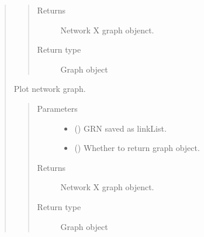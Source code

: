 \documentclass[letterpaper,10pt,english]{sphinxmanual}
\begin{document}
\begin{quote}
\begin{fulllineitems}
\begin{quote}
\begin{description}
\item[{Returns}] \leavevmode
Network X graph objenct.

\item[{Return type}] \leavevmode
Graph object

\end{description}\end{quote}

\end{fulllineitems}


\begin{fulllineitems}
\label{\detokenize{modules/celloracle.network_analysis:celloracle.network_analysis.draw_network}}
Plot network graph.
\begin{quote}\begin{description}
\item[{Parameters}] \leavevmode\begin{itemize}
\item {} 
 () \textendash{} GRN saved as linkList.

\item {} 
 () \textendash{} Whether to return graph object.

\end{itemize}

\item[{Returns}] \leavevmode
Network X graph objenct.

\item[{Return type}] \leavevmode
Graph object

\end{description}\end{quote}

\end{fulllineitems}

\end{quote}
\end{document}
